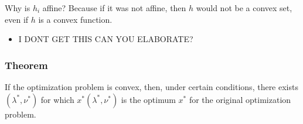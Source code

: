 \begin{intuition}
    Why is $h_i$ affine? Because if it was not affine, then $h$ would not be a convex set, even if $h$ is a convex function.
    \begin{itemize}
        \item I DONT GET THIS CAN YOU ELABORATE?
    \end{itemize}
\end{intuition}

\subsubsection{Theorem}
\begin{theorem}
    If the optimization problem is convex, then, under certain conditions, there exists \((\lambda^*, \nu^*)\) for which \(x^*(\lambda^*, \nu^*)\) is the optimum \(x^*\) for the original optimization problem.
\end{theorem}

